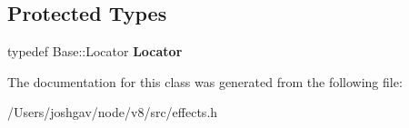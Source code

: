 \subsection*{Protected Types}
\begin{DoxyCompactItemize}
\item 
typedef Base\+::\+Locator {\bfseries Locator}\hypertarget{classv8_1_1internal_1_1_effects_mixin_adef436e550ff90b867f2697f1ff9b7e5}{}\label{classv8_1_1internal_1_1_effects_mixin_adef436e550ff90b867f2697f1ff9b7e5}

\end{DoxyCompactItemize}


The documentation for this class was generated from the following file\+:\begin{DoxyCompactItemize}
\item 
/\+Users/joshgav/node/v8/src/effects.\+h\end{DoxyCompactItemize}
